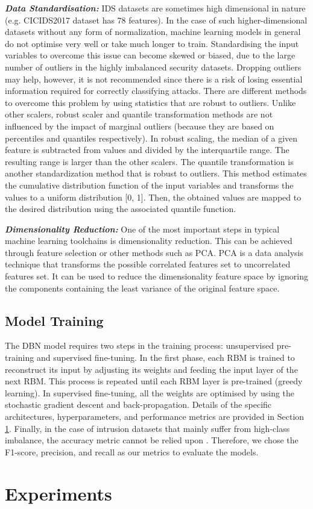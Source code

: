 \documentclass[runningheads]{llncs}
\begin{document}
\textbf{\textit{Data Standardisation:}}
\ac{IDS} datasets are sometimes high dimensional in nature (e.g. CICIDS2017 dataset has 78 features). In the case of such higher-dimensional datasets without any form of normalization, machine learning models in general do not optimise very well or take much longer to train. Standardising the input variables to overcome this issue can become skewed or biased, due to the large number of outliers in the highly imbalanced security datasets. Dropping outliers may help, however, it is not recommended since there is a risk of losing essential information required for correctly classifying attacks. There are different methods to overcome this problem by using statistics that are robust to outliers. Unlike other scalers, robust scaler and quantile transformation methods are not influenced by the impact of marginal outliers (because they are based on percentiles and quantiles respectively). In robust scaling, the median of a given feature is subtracted from values and divided by the interquartile range. The resulting range is larger than the other scalers. The quantile transformation is another standardization method that is robust to outliers. This method estimates the cumulative distribution function of the input variables and transforms the values to a uniform distribution [0, 1]. Then, the obtained values are mapped to the desired distribution using the associated quantile function.

\textbf{\textit{Dimensionality Reduction:}}
One of the most important steps in typical machine learning toolchains is dimensionality reduction. This can be achieved through feature selection or other methods such as \ac{PCA}. \ac{PCA} is a data analysis technique that transforms the possible correlated features set to uncorrelated features set. 
It can be used to reduce the dimensionality feature space by ignoring the components containing the least variance of the original feature space. 

\subsection{Model Training}
\label{subsec:model training}
The \ac{DBN} model requires two steps in the training process: unsupervised pre-training and supervised fine-tuning. In the first phase, each \ac{RBM} is trained to reconstruct its input by adjusting its weights and feeding the input layer of the next \ac{RBM}. This process is repeated until each \ac{RBM} layer is pre-trained (greedy learning). In supervised fine-tuning, all the weights are optimised by using the stochastic gradient descent and back-propagation.
Details of the specific architectures, hyperparameters, and performance metrics are provided in Section \ref{sec:experiments}. 
Finally, in the case of intrusion datasets that mainly suffer from high-class imbalance, the accuracy metric cannot be relied upon \cite{Galar}. Therefore, we chose the F1-score, precision, and recall as our metrics to evaluate the models. \section{Experiments}
\label{sec:experiments}
\end{document}
